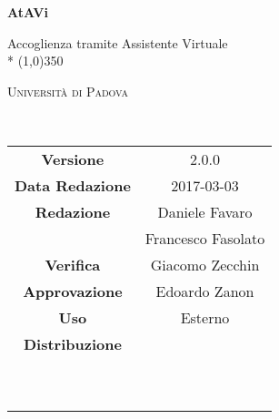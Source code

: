 \documentclass[a4paper,12pt]{article}
\author{Daniele Favaro, Francesco Fasolato}
\date{2016-12-09}
\begin{document}
	\begin{titlepage}
		\centering
		{\huge\bfseries AtAVi\par}
		Accoglienza tramite Assistente Virtuale \\*
		\line(1,0){350} \\
		{\scshape\LARGE Università di Padova \par}
		\vspace{1cm}
		{\scshape\Large \pianodiqualificai\ \par}
		\logo
		\newpage
		\begin{tabular}{c|c}
			{\hfill\textbf{Versione}} 			& 2.0.0				\\
			{\hfill\textbf{Data Redazione}} 	& 2017-03-03 		\\
			{\hfill\textbf{Redazione}} 			& Daniele Favaro \\ & Francesco Fasolato \\
			{\hfill\textbf{Verifica}} 			& Giacomo Zecchin				\\
			{\hfill\textbf{Approvazione}} 		& Edoardo Zanon				\\
			{\hfill\textbf{Uso}} 				& Esterno 					\\
			{\hfill\textbf{Distribuzione}} 		& \vardanega\ \\ & \cardin\ \\ & \prop\ \\
		\end{tabular}
	\end{titlepage}
	
	\pagestyle{myfront}
	\newpage
		
	
	\newpage
		\tableofcontents 	%
	\newpage
		\listoftables 		%
	
	\label{LastFrontPage}
	
	\newpage	
	\pagestyle{mymain}
		
	\newpage	
			
	\newpage	
		
	\newpage	
		
	\newpage	
		
	\newpage	
		
		
	\label{LastPage}
\end{document}
